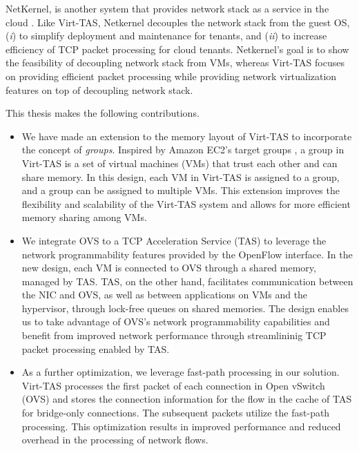 NetKernel, is another system that provides network stack as a service in the cloud
\cite{niu2021netkernel, niu2017network}.
Like Virt-TAS, Netkernel decouples the network stack from the guest OS, 
(\emph{i}) to simplify deployment and maintenance for tenants, and (\emph{ii}) to increase  
efficiency of TCP packet processing for cloud tenants. Netkernel's 
goal is to show the feasibility of decoupling network stack from VMs, whereas Virt-TAS
focuses on providing efficient packet processing while providing network virtualization 
features on top of decoupling network stack.

This thesis makes the following contributions.
\begin{itemize}
    \item 
    We have made an extension to the memory layout of Virt-TAS to incorporate the 
    concept of \emph{groups}. Inspired by Amazon EC2's target groups \cite{ec2target}
    , a group in Virt-TAS is a set of virtual machines (VMs) that trust each other and 
    can share memory. In this design, each VM in Virt-TAS is assigned to a group, 
    and a group can be assigned to multiple VMs. This extension improves the flexibility 
    and scalability of the Virt-TAS system and allows for more efficient memory sharing
     among VMs.

    \item We integrate OVS to a TCP Acceleration Service (TAS) to leverage the 
    network programmability features provided by the OpenFlow interface. In the new design,
    each VM is connected to OVS through a shared memory, managed by TAS.
    TAS, on the other hand, facilitates communication between the NIC and OVS, as well as 
    between applications on VMs and the hypervisor, through lock-free queues on shared memories.
    The design enables us to take advantage 
    of OVS's network programmability capabilities and benefit from improved network performance 
    through streamlininig TCP packet processing enabled by TAS.

    \item As a further optimization, we leverage fast-path processing in our solution. 
    Virt-TAS processes the first packet of each connection in Open vSwitch (OVS) and 
    stores the connection information for the flow in the cache of TAS for bridge-only 
    connections. The subsequent packets utilize the fast-path processing. 
    This optimization results in improved performance and reduced overhead in 
    the processing of network flows. 

\end{itemize}

